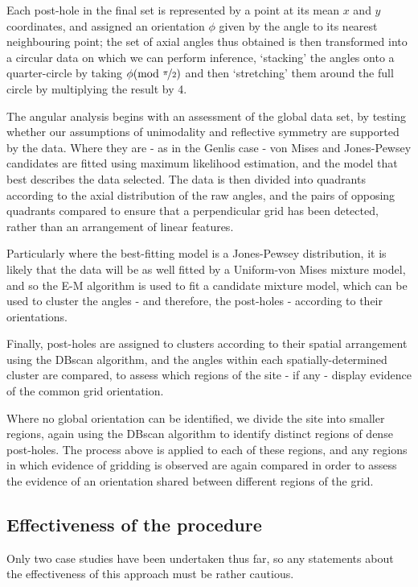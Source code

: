 \documentclass[../../ArchStats.tex]{subfiles}
\begin{document}
Each post-hole in the final set is represented by a point at its mean $x$ and $y$ coordinates, and assigned an orientation $\phi$ given by the angle to its nearest neighbouring point; the set of axial angles thus obtained is then transformed into a circular data on which we can perform inference, `stacking' the angles onto a quarter-circle by taking $\phi (\text{mod }\nicefrac{\pi}{2})$ and then `stretching' them around the full circle by multiplying the result by 4.

The angular analysis begins with an assessment of the global data set, by testing whether our assumptions of unimodality and reflective symmetry are supported by the data. Where they are - as in the Genlis case - von Mises and Jones-Pewsey candidates are fitted using maximum likelihood estimation, and the model that best describes the data selected. The data is then divided into quadrants according to the axial distribution of the raw angles, and the pairs of opposing quadrants compared to ensure that a perpendicular grid has been detected, rather than an arrangement of linear features.

Particularly where the best-fitting model is a Jones-Pewsey distribution, it is likely that the data will be as well fitted by a Uniform-von Mises mixture model, and so the E-M algorithm is used to fit a candidate mixture model, which can be used to cluster the angles - and therefore, the post-holes - according to their orientations.

Finally, post-holes are assigned to clusters according to their spatial arrangement using the DBscan algorithm, and the angles within each spatially-determined cluster are compared, to assess which regions of the site - if any - display evidence of the common grid orientation.

Where no global orientation can be identified, we divide the site into smaller regions, again using the DBscan algorithm to identify distinct regions of dense post-holes. The process above is applied to each of these regions, and any regions in which  evidence of gridding is observed are again compared in order to assess the evidence of an orientation shared between different regions of the grid.

\subsection{Effectiveness of the procedure}
Only two case studies have been undertaken thus far, so any statements about the effectiveness of this approach must be rather cautious.
\end{document}
